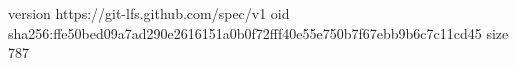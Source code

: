 version https://git-lfs.github.com/spec/v1
oid sha256:ffe50bed09a7ad290e2616151a0b0f72fff40e55e750b7f67ebb9b6c7c11cd45
size 787
